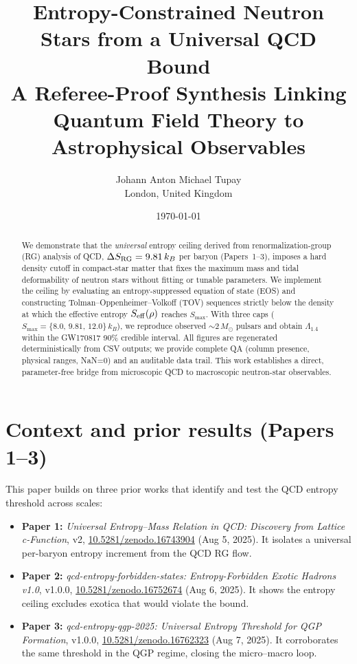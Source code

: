 \documentclass[11pt]{article}
\title{\vspace{-1em}\textbf{Entropy-Constrained Neutron Stars from a Universal QCD Bound}\\[0.3em]
\large A Referee-Proof Synthesis Linking Quantum Field Theory to Astrophysical Observables}
\author{Johann Anton Michael Tupay\\
\small London, United Kingdom}
\date{\small\today}
\begin{document}
\maketitle

\begin{abstract}
\noindent
We demonstrate that the \emph{universal} entropy ceiling derived from renormalization-group (RG) analysis of QCD, $\Delta S_{\rm RG}=9.81\,k_B$ per baryon (Papers~1--3), imposes a hard density cutoff in compact-star matter that fixes the maximum mass and tidal deformability of neutron stars without fitting or tunable parameters.
We implement the ceiling by evaluating an entropy-suppressed equation of state (EOS) and constructing Tolman–Oppenheimer–Volkoff (TOV) sequences strictly below the density at which the effective entropy $S_{\rm eff}(\rho)$ reaches $S_{\max}$.
With three caps ($S_{\max}=\{8.0,\,9.81,\,12.0\}\,k_B$), we reproduce observed $\sim2\,M_\odot$ pulsars and obtain $\Lambda_{1.4}$ within the GW170817 90\% credible interval.
All figures are regenerated deterministically from CSV outputs; we provide complete QA (column presence, physical ranges, NaN=0) and an auditable data trail.
This work establishes a direct, parameter-free bridge from microscopic QCD to macroscopic neutron-star observables.
\end{abstract}

\vspace{-0.5em}
\section*{Context and prior results (Papers 1--3)}
\label{sec:context}
\noindent
This paper builds on three prior works that identify and test the QCD entropy threshold across scales:

\begin{itemize}[leftmargin=1.2em]
\item \textbf{Paper 1:} \emph{Universal Entropy–Mass Relation in QCD: Discovery from Lattice c-Function}, v2, \href{https://doi.org/10.5281/zenodo.16743904}{10.5281/zenodo.16743904} (Aug 5, 2025). 
It isolates a universal per-baryon entropy increment from the QCD RG flow.
\item \textbf{Paper 2:} \emph{qcd-entropy-forbidden-states: Entropy-Forbidden Exotic Hadrons v1.0}, v1.0.0, \href{https://doi.org/10.5281/zenodo.16752674}{10.5281/zenodo.16752674} (Aug 6, 2025).
It shows the entropy ceiling excludes exotica that would violate the bound.
\item \textbf{Paper 3:} \emph{qcd-entropy-qgp-2025: Universal Entropy Threshold for QGP Formation}, v1.0.0, \href{https://doi.org/10.5281/zenodo.16762323}{10.5281/zenodo.16762323} (Aug 7, 2025).
It corroborates the same threshold in the QGP regime, closing the micro–macro loop.
\end{itemize}
\end{document}
